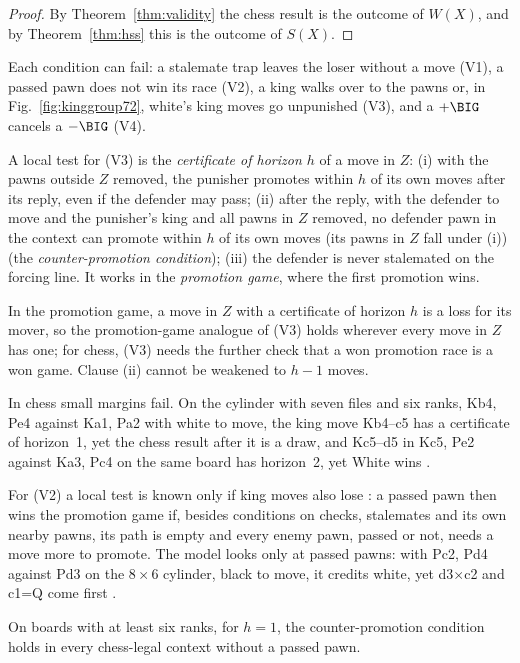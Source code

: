 \begin{proof}
By Theorem~\ref{thm:validity} the chess result is the outcome of $W(X)$, and by Theorem~\ref{thm:hss} this is
the outcome of $S(X)$.
\end{proof}

Each condition can fail: a stalemate trap leaves the loser without a move (V1), a passed pawn does not win its
race (V2), a king walks over to the pawns or, in Fig.~\ref{fig:kinggroup72}, white's king moves go unpunished
(V3), and a $+\BIG$ cancels a $-\BIG$ (V4).

A local test for (V3) is the \emph{certificate of horizon $h$} of a move in $Z$: (i) with the pawns outside $Z$
removed, the punisher promotes within $h$ of its own moves after its reply, even if the defender may pass; (ii)
after the reply, with the defender to move and the punisher's king and all pawns in $Z$ removed, no defender
pawn in the context can promote within $h$ of its own moves (its pawns in $Z$ fall under (i)) (the \emph{counter-promotion condition}); (iii) the defender is never stalemated on the forcing
line. It works in the \emph{promotion game}, where the first promotion
wins.

\begin{theorem}[\lab{S}]\label{thm:cert}
In the promotion game, a move in $Z$ with a certificate of horizon $h$ is a loss for its mover, so the
promotion-game analogue of (V3) holds wherever every move in $Z$ has one; for chess, (V3) needs the further
check that a won promotion race is a won game. Clause (ii) cannot be weakened to $h-1$ moves.
\end{theorem}

In chess small margins fail. On the cylinder with seven files and six ranks, Kb4, Pe4 against Ka1, Pa2 with
white to move, the king move Kb4--c5 has a certificate of horizon~1, yet the chess result after it is a draw, and
Kc5--d5 in Kc5, Pe2 against Ka3, Pc4 on the same board has horizon~2, yet White wins .

For (V2) a local test is known only if king moves also lose : a passed pawn then wins the promotion
game if, besides conditions on checks, stalemates and its own nearby pawns, its path is empty and every enemy
pawn, passed or not, needs a move more to promote. The model looks only at passed pawns: with Pc2, Pd4 against
Pd3 on the $8\times6$ cylinder, black to move, it credits white, yet d3$\times$c2 and c1=Q come first .

\begin{proposition}[\lab{S}]\label{prop:horizon1}
On boards with at least six ranks, for $h=1$, the counter-promotion condition holds in every chess-legal
context without a passed pawn.
\end{proposition}

